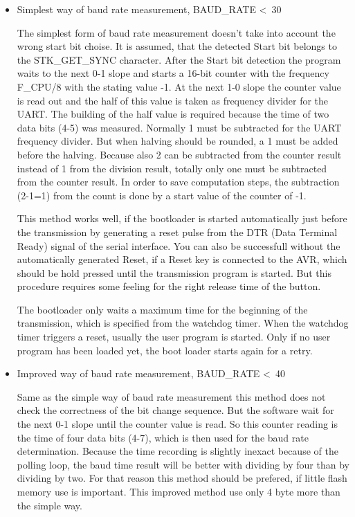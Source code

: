 \begin{itemize}

\item {Simplest way of baud rate measurement, BAUD\_RATE \textless~30}

The simplest form of baud rate measurement doesn't take into account
the wrong start bit choise.
It is assumed, that the detected Start bit belongs to the STK\_GET\_SYNC
character.
After the Start bit detection the program waits to the next 0-1 slope
and starts a 16-bit counter with the frequency F\_CPU/8 with the
stating value -1. At the next 1-0 slope the counter value is read out
and the half of this value is taken as frequency divider for the UART.
The building of the half value is required because the time of two data bits (4-5)
was measured.
Normally 1 must be subtracted for the UART frequency divider.
But when halving should be rounded, a 1 must be added before the halving.
Because also 2 can be subtracted from the counter result instead of
1 from the division result, totally only one must be subtracted from the
counter result. In order to save computation steps, the subtraction (2-1=1)
from the count is done by a start value of the counter of -1.

This method works well, if the bootloader is started automatically just
before the transmission by generating a reset pulse from the DTR (Data Terminal Ready)
signal of the serial interface.
You can also be successfull without the automatically generated Reset,
if a Reset key is connected to the AVR, which should be hold pressed
until the transmission program is started.
But this procedure requires some feeling for the right release time
of the button.

The bootloader only waits a maximum time for the beginning of the transmission,
which is specified from the watchdog timer.
When the watchdog timer triggers a reset, usually the user program is started.
Only if no user program has been loaded yet, the boot loader starts again for a retry.

\item {Improved way of baud rate measurement, BAUD\_RATE \textless~40}

Same as the simple way of baud rate measurement this method does not
check the correctness of the bit change sequence.
But the software wait for the next 0-1 slope until the counter value
is read.
		So this counter reading is the time of four data bits (4-7),
which is then used for the baud rate determination.
Because the time recording is slightly inexact because of the
polling loop, the baud time result will be better with dividing by four
than by dividing by two.
For that reason this method should be prefered, if little flash memory
use is important. This improved method use only 4 byte more than the
simple way.


\end{itemize}
